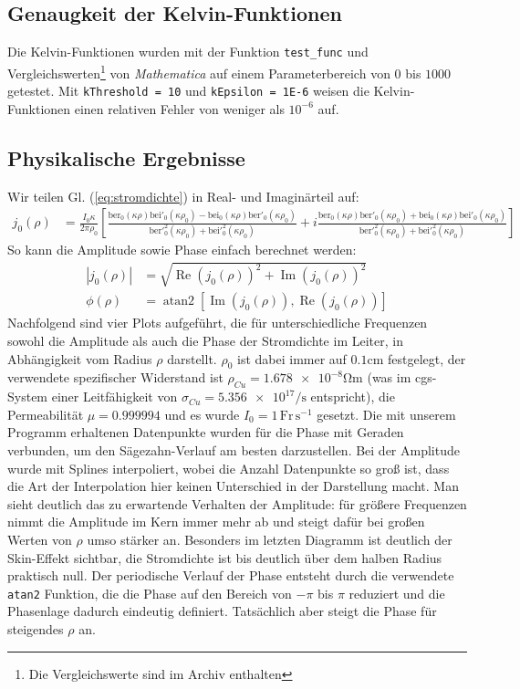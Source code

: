 \documentclass[10pt,a4paper]{article}
\begin{document}
\subsection{Genaugkeit der Kelvin-Funktionen}
Die Kelvin-Funktionen wurden mit der Funktion \texttt{test\_func} und Vergleichswerten\footnote{Die Vergleichswerte sind im Archiv enthalten} von \emph{Mathematica} auf einem Parameterbereich von $0$ bis $1000$ getestet.
Mit \texttt{kThreshold = 10} und \texttt{kEpsilon = 1E-6} weisen die Kelvin-Funktionen einen relativen Fehler von weniger als $10^{-6}$ auf.

\subsection{Physikalische Ergebnisse}
\label{ssec:physikalischeergebnisse}
Wir teilen Gl. (\ref{eq:stromdichte}) in Real- und Imaginärteil auf:
\begin{align}
	j_0(\rho) &= \frac{I_0 \kappa}{2 \pi \rho_0} \left[ \frac{\mathrm{ber}_0(\kappa \rho)\mathrm{bei}'_0(\kappa \rho_0) - \mathrm{bei}_0(\kappa \rho)\mathrm{ber}'_0(\kappa \rho_0)}{\mathrm{ber}'^2_0(\kappa \rho_0)+\mathrm{bei}'^2_0(\kappa \rho_0)} + i\frac{\mathrm{ber}_0(\kappa \rho)\mathrm{ber}'_0(\kappa \rho_0) + \mathrm{bei}_0(\kappa \rho)\mathrm{bei}'_0(\kappa \rho_0)}{\mathrm{ber}'^2_0(\kappa \rho_0)+\mathrm{bei}'^2_0(\kappa \rho_0)}\right]
\end{align}
So kann die Amplitude sowie Phase einfach berechnet werden:
\begin{align}
	|j_0(\rho)| &= \sqrt{\operatorname{Re}(j_0(\rho))^2 + \operatorname{Im}(j_0(\rho))^2}\\
	\phi(\rho) &= \operatorname{atan2}\left[\operatorname{Im}(j_0(\rho)), \operatorname{Re}(j_0(\rho))\right]
\end{align}
Nachfolgend sind vier Plots aufgeführt, die für unterschiedliche Frequenzen sowohl die Amplitude als auch die Phase der Stromdichte im Leiter, in Abhängigkeit vom Radius $\rho$ darstellt. $\rho_0$ ist dabei immer auf $\num{0.1} \si{\centi\metre}$ festgelegt, der verwendete spezifischer Widerstand ist $\rho_{Cu} = \num{1.678e-8} \si{\ohm\metre}$ \cite{crchandbook} (was im cgs-System einer Leitfähigkeit von $\sigma_{Cu} = \num{5.356e17} \si{\per\second}$ entspricht), die Permeabilität $\mu = \num{0.999994}$ \cite{crchandbook} und es wurde $I_0 = \num{1} \, \mathrm{Fr}\,\mathrm{s}^{-1}$ gesetzt. Die mit unserem Programm erhaltenen Datenpunkte wurden für die Phase mit Geraden verbunden, um den Sägezahn-Verlauf am besten darzustellen. Bei der Amplitude wurde mit Splines interpoliert, wobei die Anzahl Datenpunkte so groß ist, dass die Art der Interpolation hier keinen Unterschied in der Darstellung macht. Man sieht deutlich das zu erwartende Verhalten der Amplitude: für größere Frequenzen nimmt die Amplitude im Kern immer mehr ab und steigt dafür bei großen Werten von $\rho$ umso stärker an. Besonders im letzten Diagramm ist deutlich der Skin-Effekt sichtbar, die Stromdichte ist bis deutlich über dem halben Radius praktisch null. Der periodische Verlauf der Phase entsteht durch die verwendete \texttt{atan2} Funktion, die die Phase auf den Bereich von $-\pi$ bis $\pi$ reduziert und die Phasenlage dadurch eindeutig definiert. Tatsächlich aber steigt die Phase für steigendes $\rho$ an.
\end{document}
